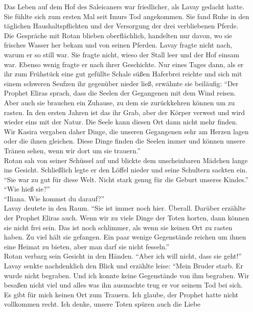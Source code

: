 Das Leben auf dem Hof des Saleicaners war friedlicher, als Lavay gedacht hatte. Sie fühlte sich zum 
ersten Mal seit Imurs Tod angekommen. Sie fand Ruhe in den täglichen Haushaltspflichten und der 
Versorgung der drei verbliebenen Pferde. Die Gespräche mit Rotan blieben oberflächlich, handelten 
nur davon, wo sie frisches Wasser her bekam und von seinen Pferden. Lavay fragte nicht nach, warum 
er so still war. Sie fragte nicht, wieso der Stall leer und der Hof einsam war. Ebenso wenig fragte 
er nach ihrer Geschichte. Nur eines Tages dann, als er ihr zum Frühstück eine gut gefüllte Schale 
süßen Haferbrei reichte und sich mit einem schweren Seufzen ihr gegenüber nieder ließ, erwähnte sie 
beiläufig: ``Der Prophet Eliras sprach, dass die Seelen der Gegangenen mit dem Wind reisen. Aber 
auch sie brauchen ein Zuhause, zu dem sie zurückkehren können um zu rasten. In den ersten Jahren 
ist das ihr Grab, aber der Körper verwest und wird wieder eins mit der Natur. Die Seele kann diesen 
Ort dann nicht mehr finden. Wir Kasira vergaben daher Dinge, die unseren Gegangenen sehr am Herzen 
lagen oder die ihnen gleichen. Diese Dinge finden die Seelen immer und können unsere Tränen sehen, 
wenn wir dort um sie trauern.''\\
Rotan sah von seiner Schüssel auf und blickte dem unscheinbaren Mädchen lange ins Gesicht. 
Schließlich legte er den Löffel nieder und seine Schultern sackten ein. ``Sie war zu gut für diese 
Welt. Nicht stark genug für die Geburt unseres Kindes.''\\
``Wie hieß sie?''\\
``Iliana. Wie kommst du darauf?''\\
Lavay deutete in den Raum. ``Sie ist immer noch hier. Überall. Darüber erzählte der Prophet Eliras 
auch. Wenn wir zu viele Dinge der Toten horten, dann können sie nicht frei sein. Das ist noch 
schlimmer, als wenn sie keinen Ort zu rasten haben. Zu viel hält sie gefangen. Ein paar wenige 
Gegenstände reichen um ihnen eine Heimat zu bieten, aber man darf sie nicht fesseln.''\\
Rotan verbarg sein Gesicht in den Händen. ``Aber ich will nicht, dass sie geht!''\\
Lavay senkte nachdenklich den Blick und erzählte leise: ``Mein Bruder starb. Er wurde nicht 
begraben. Und ich konnte keine Gegenstände von ihm begraben. Wir besaßen nicht viel und alles was 
ihn ausmachte trug er vor seinem Tod bei sich. Es gibt für mich keinen Ort zum Trauern. Ich 
glaube, der Prophet hatte nicht vollkommen recht. Ich denke, unsere Toten spüren auch die Liebe 
